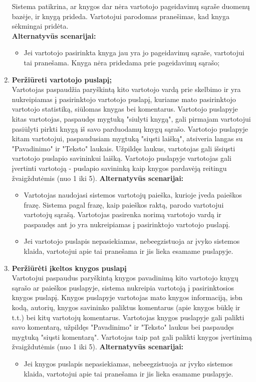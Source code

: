 \documentclass{VUMIFPSkursinis}
\begin{document}
\begin{enumerate}[label=\textbf{U\arabic*.}]
				Sistema patikrina, ar knygos dar nėra vartotojo pageidavimų sąraše duomenų bazėje, ir knygą prideda.
				Vartotojui parodomas pranešimas, kad knyga sėkmingai pridėta.\\
				\textbf{Alternatyvūs scenarijai:}
				\begin{itemize}
					\item Jei vartotojo pasirinkta knyga jau yra jo pageidavimų sąraše, vartotojui tai pranešama. Knyga nėra pridedama prie pageidavimų sąrašo;
				\end{itemize}
			\item \textbf{Peržiūreti vartotojo puslapį;}\\
				Vartotojas paspaudžia paryškintą kito vartotojo vardą prie skelbimo ir yra nukreipiamas į pasirinktojo vartotojo puslapį, kuriame mato pasirinktojo vartotojo statistiką, siūlomas knygas bei komentarus. 
				Vartotojo puslapyje kitas vartotojas, paspaudęs mygtuką "siulyti knygą", gali pirmajam vartotojui pasiūlyti pirkti knygą iš savo parduodamų knygų sąrašo.
				Vartotojo puslapyje kitam vartotojui, paspaudusiam mygtuką "siųsti laišką", atsiveria langas su "Pavadinimo" ir "Teksto" laukais. Užpildęs laukus, vartotojas gali išsiųsti vartotojo puslapio savininkui laišką. 
				Vartotojo puslapyje vartotojas gali įvertinti vartotoją - puslapio savininką kaip knygos pardavėją reitingu žvaigždutėmis (nuo 1 iki 5).
				\textbf{Alternatyvūs scenarijai:}
				\begin{itemize}
					\item Vartotojas naudojasi sistemos vartotojų paieška, kurioje įveda paieškos frazę. Sistema pagal frazę, kaip paieškos raktą, parodo vartotojui vartotojų sąrašą.  Vartotojas pasirenka norimą vartotojo vardą ir paspaudęs ant jo yra nukreipiamas į pasirinktojo vartotojo puslapį.
					\item Jei vartotojo puslapis nepasiekiamas, nebeegzistuoja ar įvyko sistemos klaida, vartotojui apie tai pranešama ir jis lieka esamame puslapyje.
				\end{itemize}
			\item \textbf{Peržiūrėti įkeltos knygos puslapį}\\
				Vartotojui paspaudus paryškintą knygos pavadinimą kito vartotojo knygų sąrašo ar paieškos puslapyje, sistema nukreipia vartotoją į pasirinktosios knygos puslapį.
				Knygos puslapyje vartotojas mato knygos informaciją, isbn kodą, autorių, knygos savininko paliktus komentarus (apie knygos būklę ir t.t.) bei kitų vartotojų komentarus.
				Vartotojas knygos puslapyje gali palikti savo komentarą, užpildęs "Pavadinimo" ir "Teksto" laukus bei paspaudęs mygtuką "siųsti komentarą". Vartotojas taip pat gali palikti knygos įvertinimą žvaigždutėmis (nuo 1 iki 5).
				\textbf{Alternatyvūs scenarijai:}
				\begin{itemize}
					\item Jei knygos puslapis nepasiekiamas, nebeegzistuoja ar įvyko sistemos klaida, vartotojui apie tai pranešama ir jis lieka esamame puslapyje.
				\end{itemize}


\end{enumerate}
\end{document}
